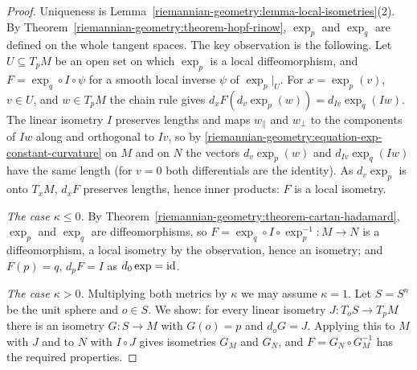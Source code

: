 \begin{proof}
Uniqueness is Lemma~\ref{riemannian-geometry:lemma-local-isometries}(2). By Theorem~\ref{riemannian-geometry:theorem-hopf-rinow}, $\exp_p$ and $\exp_q$ are defined on
the whole tangent spaces. The key observation is the following. Let $U \subseteq T_pM$ be an open set on which $\exp_p$ is a local diffeomorphism, and
$F = \exp_q \circ I \circ \psi$ for a smooth local inverse $\psi$ of $\exp_p|_U$. For $x = \exp_p(v)$, $v \in U$, and $w \in T_pM$ the chain rule gives
$d_xF(d_v\exp_p(w)) = d_{Iv}\exp_q(Iw)$. The linear isometry $I$ preserves lengths and maps $w_\parallel$ and $w_\perp$ to the components of $Iw$ along and orthogonal to
$Iv$, so by \eqref{riemannian-geometry:equation-exp-constant-curvature} on $M$ and on $N$ the vectors $d_v\exp_p(w)$ and $d_{Iv}\exp_q(Iw)$ have the same length (for $v = 0$ both differentials are the identity). As
$d_v\exp_p$ is onto $T_xM$, $d_xF$ preserves lengths, hence inner products: $F$ is a local isometry.

\emph{The case $\kappa \leq 0$.} By Theorem~\ref{riemannian-geometry:theorem-cartan-hadamard}, $\exp_p$ and $\exp_q$ are diffeomorphisms, so
$F = \exp_q \circ I \circ \exp_p^{-1} \colon M \to N$ is a diffeomorphism, a local isometry by the observation, hence an isometry; and $F(p) = q$, $d_pF = I$ as
$d_0\exp = \mathrm{id}$.

\emph{The case $\kappa > 0$.} Multiplying both metrics by $\kappa$ we may assume $\kappa = 1$. Let $S = S^n$ be the unit sphere and $o \in S$. We show: for every linear
isometry $J \colon T_oS \to T_pM$ there is an isometry $G \colon S \to M$ with $G(o) = p$ and $d_oG = J$. Applying this to $M$ with $J$ and to $N$ with $I \circ J$ gives
isometries $G_M$ and $G_N$, and $F = G_N \circ G_M^{-1}$ has the required properties.


\end{proof}
